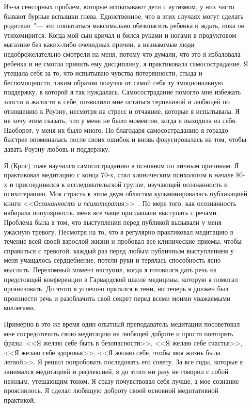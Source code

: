 	Из-за сенсорных проблем, которые испытывают дети с аутизмом, у них часто бывают бурные вспышки гнева. Единственное, что в этих случаях могут сделать родители~"--- это попытаться максимально обезопасить ребенка и ждать, пока он утихомирится. Когда мой сын кричал и бился руками и ногами в продуктовом магазине без каких-либо очевидных причин, а незнакомые люди недоброжелательно смотрели на меня, потому что думали, что это я избаловала ребенка и не смогла привить ему дисциплину, я практиковала самосострадание. Я утешала себя за то, что испытываю чувства потерянности, стыда и беспомощности, таким образом получая от самой себя ту эмоциональную поддержку, в которой я так нуждалась. Самосострадание помогло мне избежать злости и жалости к себе, позволило мне остаться терпеливой и любящей по отношению к Роуэну, несмотря на стресс и отчаяние, которые я испытывала. Я не хочу этим сказать, что у меня не было моментов, когда я выходила из себя. Наоборот, у меня их было много. Но благодаря самосостраданию я гораздо быстрее опоминалась после своих ошибок и вновь фокусировалась на том, чтобы давать Роуэну любовь и поддержку.
	
	Я (Крис) тоже научился самосостраданию в основном по личным причинам. Я практиковал медитацию с конца 70-х, стал клиническим психологом в начале 80-х и присоединился к исследовательской группе, изучающей осознанность и психотерапию. Моя страсть к этим двум областям  кульминировалась публикацией книги <<\emph{Осознанность и психотерапия}>>~\cite{18}. По мере того, как осознанность набирала популярность, меня все чаще приглашали выступать с речами. Проблема была в том, что выступления перед публикой вызывали у меня ужасную тревогу. Несмотря на то, что я регулярно практиковал медитацию в течение всей своей взрослой жизни и пробовал все клинические приемы, чтобы справиться с тревогой, каждый раз перед любым публичным выступлением у меня учащалось сердцебиение, потели руки и терялась способность ясно мыслить. Переломный момент наступил, когда я готовился дать речь на предстоящей конференции в Гарвардской школе медицины, которую я помогал организовать. До этого я успешно прятался в тени, но теперь я должен был произнести речь и разоблачить свой секрет перед всеми моими уважаемыми коллегами.
	
	Примерно в это же время один опытный преподаватель медитации посоветовал мне сосредоточить свою медитацию на любящей доброте и просто повторять фразы: <<Я желаю себе быть в безопасности>>, <<Я желаю себе счастья>>, <<Я желаю себе здоровья>>, <<Я желаю себе, чтобы моя жизнь была легкой>>. Я решил попробовать последовать его совету. За все годы, которые я занимался медитацией и рефлексией, я до этого ни разу не говорил с собой нежным, утешающим тоном. Я сразу почувствовал себя лучше, а мое сознание прояснилось. Я сделал любящую доброту своей основной медитативной практикой. 
	
